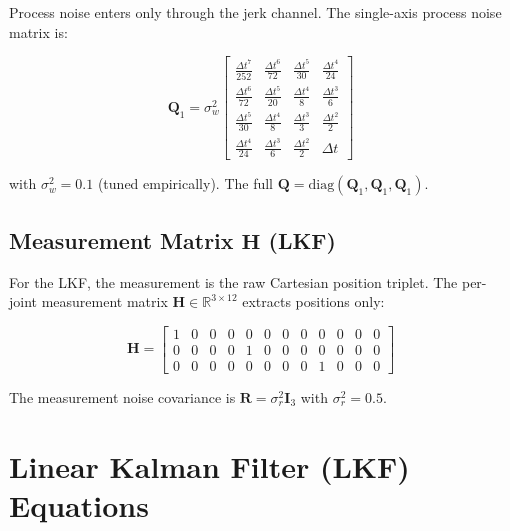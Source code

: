 \documentclass[12pt, a4paper]{article}
\begin{document}
Process noise enters only through the jerk channel. The single-axis process noise matrix is:

\begin{equation}
\mathbf{Q}_1 = \sigma_w^2 \begin{bmatrix}
\tfrac{\Delta t^7}{252} & \tfrac{\Delta t^6}{72} & \tfrac{\Delta t^5}{30} & \tfrac{\Delta t^4}{24} \\
\tfrac{\Delta t^6}{72} & \tfrac{\Delta t^5}{20} & \tfrac{\Delta t^4}{8}  & \tfrac{\Delta t^3}{6}  \\
\tfrac{\Delta t^5}{30} & \tfrac{\Delta t^4}{8}  & \tfrac{\Delta t^3}{3}  & \tfrac{\Delta t^2}{2}  \\
\tfrac{\Delta t^4}{24} & \tfrac{\Delta t^3}{6}  & \tfrac{\Delta t^2}{2}  & \Delta t
\end{bmatrix}
\label{eq:Q1}
\end{equation}

with $\sigma_w^2 = 0.1$ (tuned empirically). The full $\mathbf{Q} = \mathrm{diag}(\mathbf{Q}_1,\mathbf{Q}_1,\mathbf{Q}_1)$.

\subsection{Measurement Matrix \texorpdfstring{$\mathbf{H}$}{H} (LKF)}

For the LKF, the measurement is the raw Cartesian position triplet. The per-joint measurement matrix $\mathbf{H} \in \mathbb{R}^{3\times12}$ extracts positions only:

\begin{equation}
\mathbf{H} = \begin{bmatrix}
1 & 0 & 0 & 0 & 0 & 0 & 0 & 0 & 0 & 0 & 0 & 0 \\
0 & 0 & 0 & 0 & 1 & 0 & 0 & 0 & 0 & 0 & 0 & 0 \\
0 & 0 & 0 & 0 & 0 & 0 & 0 & 0 & 1 & 0 & 0 & 0
\end{bmatrix}
\label{eq:H}
\end{equation}

The measurement noise covariance is $\mathbf{R} = \sigma_r^2 \mathbf{I}_3$ with $\sigma_r^2 = 0.5$.

\section{Linear Kalman Filter (LKF) Equations}
\end{document}
